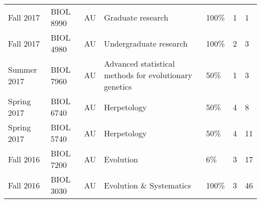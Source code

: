 {\begin{longtable}[l]{ p{0.79in} p{0.65in} p{0.60in} p{1.7in} p{0.58in} p{0.34in} p{0.70in} }
    Fall 2017 & BIOL 8990 & AU & Graduate research & 100\% & 1 & 1 \\ 
    Fall 2017 & BIOL 4980 & AU & Undergraduate research & 100\% & 2 & 3 \\ 
    Summer 2017 & BIOL 7960 & AU & Advanced statistical methods for evolutionary genetics & 50\% & 1 & 3 \\
    Spring 2017 & BIOL 6740 & AU & Herpetology & 50\% & 4 & 8 \\
    Spring 2017 & BIOL 5740 & AU & Herpetology & 50\% & 4 & 11 \\
    Fall 2016 & BIOL 7200 & AU & Evolution & 6\% & 3 & 17 \\
    Fall 2016 & BIOL 3030 & AU & Evolution \& Systematics & 100\% & 3 & 46 \\
\end{longtable}
}
